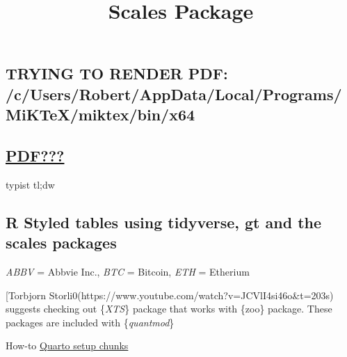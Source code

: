 \documentclass[
  letterpaper,
  DIV=11,
  numbers=noendperiod]{scrartcl}
\title{Scales Package}
\author{}
\date{}
\newenvironment{Shaded}{\begin{snugshade}}{\end{snugshade}}
\newcommand{\AttributeTok}[1]{\textcolor[rgb]{0.40,0.45,0.13}{#1}}
\newcommand{\CommentTok}[1]{\textcolor[rgb]{0.37,0.37,0.37}{#1}}
\newcommand{\FunctionTok}[1]{\textcolor[rgb]{0.28,0.35,0.67}{#1}}
\newcommand{\NormalTok}[1]{\textcolor[rgb]{0.00,0.23,0.31}{#1}}
\newcommand{\OtherTok}[1]{\textcolor[rgb]{0.00,0.23,0.31}{#1}}
\newcommand{\SpecialCharTok}[1]{\textcolor[rgb]{0.37,0.37,0.37}{#1}}
\newcommand{\StringTok}[1]{\textcolor[rgb]{0.13,0.47,0.30}{#1}}
\begin{document}
\maketitle

\subsection{TRYING TO RENDER PDF:
/c/Users/Robert/AppData/Local/Programs/MiKTeX/miktex/bin/x64}\label{trying-to-render-pdf-cusersrobertappdatalocalprogramsmiktexmiktexbinx64}

\subsection{\texorpdfstring{\href{https://www.youtube.com/watch?v=t30sqFch2v0}{PDF???}}{PDF???}}\label{pdf}

typist tl;dw

\subsection{R Styled tables using tidyverse, gt and the scales
packages}\label{r-styled-tables-using-tidyverse-gt-and-the-scales-packages}

\emph{ABBV} = Abbvie Inc., \emph{BTC} = Bitcoin, \emph{ETH} = Etherium

{[}Torbjorn Storli0(https://www.youtube.com/watch?v=JCVlI4si46o\&t=203s)
suggests checking out \{\emph{XTS}\} package that works with \{zoo\}
package. These packages are included with \{\emph{quantmod}\}

How-to
\href{https://rstudio-conf-2022.github.io/get-started-quarto/materials/03-computation-editors.html\#/knitropts_chunk-defaults}{Quarto
setup chunks}

\begin{Shaded}
\end{Shaded}
\end{document}
